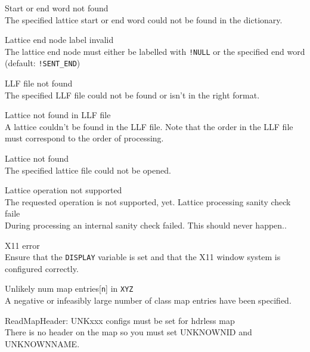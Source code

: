 \begin{itemize}
\begin{itemize}
    Start or end word not found\\
        The specified lattice start or end word could not be found in
        the dictionary.

    Lattice end node label invalid\\
        The lattice end node must either be labelled with \verb|!NULL|
        or the specified end word (default: \verb|!SENT_END|)

    LLF file not found\\
        The specified LLF file could not be found or isn't in the
        right format.

    Lattice not found in LLF file\\
        A lattice couldn't be found in the LLF file. Note that the
        order in the LLF file must correspond to the order of processing.

    Lattice not found\\
        The specified lattice file could not be opened.

    Lattice operation not supported\\
        The requested operation is not supported, yet.
    Lattice processing sanity check faile\\
        During processing an internal sanity check failed. This should
        never happen..

\end{itemize}



\begin{itemize}
    X11 error\\
        Ensure that the \texttt{DISPLAY} variable is set and that the
        X11 window system is configured correctly.

\end{itemize}




\begin{itemize}
  Unlikely num map entries[\texttt{n}] in \texttt{XYZ}\\
        A negative or infeasibly large number of class map entries
        have been specified.

 ReadMapHeader: UNKxxx configs must be set for hdrless map\\
        There is no header on the map so you must set UNKNOWNID and UNKNOWNNAME.


\end{itemize}
\end{itemize}

